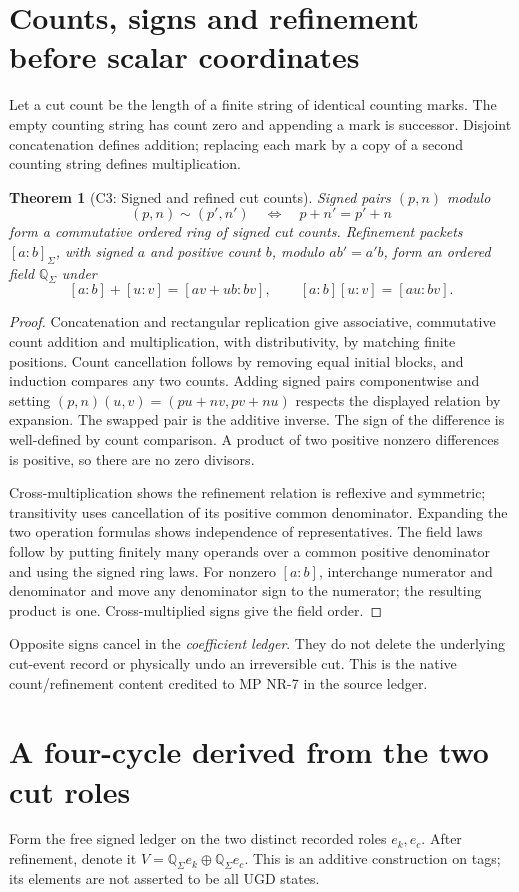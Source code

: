 \documentclass[11pt]{article}
\newtheorem{theorem}{Theorem}[section]
\newcommand{\Qcut}{\mathbb Q_\Sigma}
\begin{document}
\section{Counts, signs and refinement before scalar coordinates}
\label{sec:counts}
Let a cut count be the length of a finite string of identical counting marks.
The empty counting string has count zero and appending a mark is successor.
Disjoint concatenation defines addition; replacing each mark by a copy of a
second counting string defines multiplication.

\begin{theorem}[C3: Signed and refined cut counts]
\label{thm:counts}
Signed pairs $(p,n)$ modulo
\[
(p,n)\sim(p',n')\quad\Longleftrightarrow\quad p+n'=p'+n
\]
form a commutative ordered ring of signed cut counts. Refinement packets
$[a:b]_\Sigma$, with signed $a$ and positive count $b$, modulo
$ab'=a'b$, form an ordered field $\Qcut$ under
\[
[a:b]+[u:v]=[av+ub:bv],\qquad [a:b][u:v]=[au:bv].
\]
\end{theorem}
\begin{proof}
Concatenation and rectangular replication give associative, commutative count
addition and multiplication, with distributivity, by matching finite positions.
Count cancellation follows by removing equal initial blocks, and induction
compares any two counts. Adding signed pairs componentwise and setting
$(p,n)(u,v)=(pu+nv,pv+nu)$ respects the displayed relation by expansion.
The swapped pair is the additive inverse. The sign of the difference is
well-defined by count comparison. A product of two positive nonzero differences
is positive, so there are no zero divisors.

Cross-multiplication shows the refinement relation is reflexive and symmetric;
transitivity uses cancellation of its positive common denominator. Expanding
the two operation formulas shows independence of representatives. The field
laws follow by putting finitely many operands over a common positive
denominator and using the signed ring laws. For nonzero $[a:b]$, interchange
numerator and denominator and move any denominator sign to the numerator;
the resulting product is one. Cross-multiplied signs give the field order.
\end{proof}
Opposite signs cancel in the \emph{coefficient ledger}. They do not delete the
underlying cut-event record or physically undo an irreversible cut. This is
the native count/refinement content credited to MP NR-7 in the source ledger.

\section{A four-cycle derived from the two cut roles}
\label{sec:roles}
Form the free signed ledger on the two distinct recorded roles
$e_k,e_c$. After refinement, denote it
$V=\Qcut e_k\oplus\Qcut e_c$. This is an additive construction on tags;
its elements are not asserted to be all UGD states.
\end{document}

